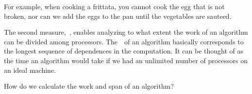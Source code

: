 \begin{cluster}
\label{grp:tch:introduction::parallelism::cooking}

\begin{teachnote}
\label{tch:introduction::parallelism::cooking}
For example, when cooking a frittata, you cannot cook the egg that is
not broken, nor can we add the eggs to the pan until the vegetables
are sauteed.

\end{teachnote}
\end{cluster}

\begin{cluster}
\label{grp:grm:introduction::parallelism::span}

\begin{gram}[Span]
\label{grm:introduction::parallelism::span}
The second measure,~, enables analyzing to what extent the
work of an algorithm can be divided among processors.
The~~of an algorithm basically corresponds to the longest
sequence of dependences in the computation.  It can be thought of as
the time an algorithm would take if we had an unlimited number of
processors on an ideal machine.

\end{gram}
\end{cluster}

\begin{cluster}
\label{grp:tch:introduction::parallelism::calculate}

\begin{teachask}
\label{tch:introduction::parallelism::calculate}
How do we calculate the work and span of an algorithm?

\end{teachask}
\end{cluster}

